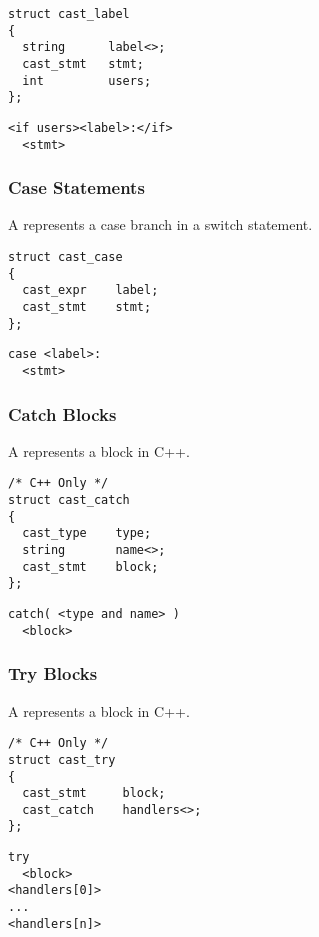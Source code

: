 \begin{verbatim}
struct cast_label
{
  string      label<>;
  cast_stmt   stmt;
  int         users;
};
\end{verbatim}

\begin{verbatim}
<if users><label>:</if>
  <stmt>
\end{verbatim}

\subsubsection{Case Statements}

A  represents a case branch in a switch statement.

\begin{verbatim}
struct cast_case
{
  cast_expr    label;
  cast_stmt    stmt;
};
\end{verbatim}

\begin{verbatim}
case <label>:
  <stmt>
\end{verbatim}

\subsubsection{Catch Blocks}

A  represents a  block in C++.

\begin{verbatim}
/* C++ Only */
struct cast_catch
{
  cast_type    type;
  string       name<>;
  cast_stmt    block;
};
\end{verbatim}

\begin{verbatim}
catch( <type and name> )
  <block>
\end{verbatim}

\subsubsection{Try Blocks}

A  represents a  block in C++.

\begin{verbatim}
/* C++ Only */
struct cast_try
{
  cast_stmt     block;
  cast_catch    handlers<>;
};
\end{verbatim}

\begin{verbatim}
try
  <block>
<handlers[0]>
...
<handlers[n]>
\end{verbatim}

